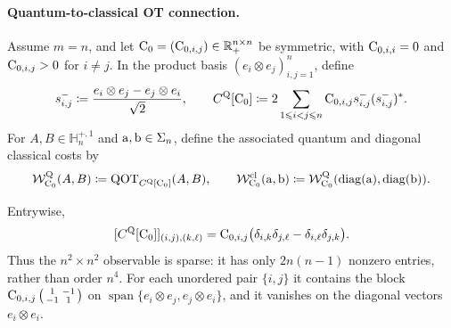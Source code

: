 \paragraph{Quantum-to-classical OT connection.}
\begin{defn}\label{def-qot-ground-cost-lift}
Assume $m=n$, and let $\mathrm{C}_0=(\mathrm{C}_{0,i,j})\in\mathbb{R}_+^{n\times n}$ be symmetric, with $\mathrm{C}_{0,i,i}=0$ and $\mathrm{C}_{0,i,j}>0$ for $i\neq j$. In the product basis $(e_i\otimes e_j)_{i,j=1}^n$, define
\begin{equation}\label{eq-qot-ground-cost-lift}
s_{i,j}^-\coloneqq\frac{e_i\otimes e_j-e_j\otimes e_i}{\sqrt2},
\qquad
C^{\mathrm Q}[\mathrm{C}_0]
\coloneqq
2\sum_{1\leqslant i<j\leqslant n}\mathrm{C}_{0,i,j}s_{i,j}^-(s_{i,j}^-)^*.
\end{equation}
For $A,B\in\mathbb H_n^{+,1}$ and $\mathrm{a},\mathrm{b}\in\Sigma_n$, define the associated quantum and diagonal classical costs by
\begin{equation}\label{eq-qot-ground-cost-values}
\mathcal W_{\mathrm{C}_0}^{\mathrm Q}(A,B)
\coloneqq\mathrm{QOT}_{C^{\mathrm Q}[\mathrm{C}_0]}(A,B),
\qquad
\mathcal W_{\mathrm{C}_0}^{\mathrm{cl}}(\mathrm{a},\mathrm{b})
\coloneqq\mathcal W_{\mathrm{C}_0}^{\mathrm Q}(\operatorname{diag}(\mathrm{a}),\operatorname{diag}(\mathrm{b})).
\end{equation}
\end{defn}
Entrywise,
\begin{equation}\label{eq-qot-ground-cost-lift-entries}
[C^{\mathrm Q}[\mathrm{C}_0]]_{(i,j),(k,\ell)}
=
\mathrm{C}_{0,i,j}\bigl(\delta_{i,k}\delta_{j,\ell}-\delta_{i,\ell}\delta_{j,k}\bigr).
\end{equation}
Thus the $n^2\times n^2$ observable is sparse: it has only $2n(n-1)$ nonzero entries, rather than order $n^4$. For each unordered pair $\{i,j\}$ it contains the block $\mathrm{C}_{0,i,j}\left(\begin{smallmatrix}1&-1\\-1&1\end{smallmatrix}\right)$ on $\operatorname{span}\{e_i\otimes e_j,e_j\otimes e_i\}$, and it vanishes on the diagonal vectors $e_i\otimes e_i$.

